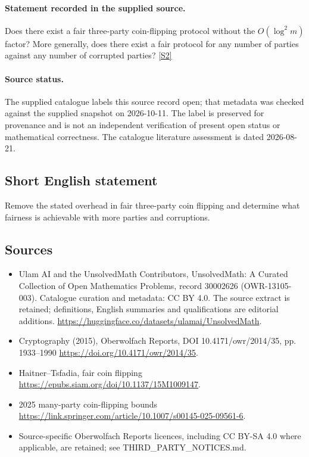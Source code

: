 \documentclass[11pt]{article}
\begin{document}
\paragraph{Statement recorded in the supplied source.}
Does there exist a fair three-party coin-flipping protocol without the $O(\log^2 m)$ factor? More generally, does there exist a fair protocol for any number of parties against any number of corrupted parties? \href{https://doi.org/10.4171/owr/2014/35}{[S2]}
\paragraph{Source status.}
The supplied catalogue labels this source record open; that metadata was checked against the supplied snapshot on 2026-10-11. The label is preserved for provenance and is not an independent verification of present open status or mathematical correctness. The catalogue literature assessment is dated 2026-08-21.
\subsection{Short English statement}
Remove the stated overhead in fair three-party coin flipping and determine what fairness is achievable with more parties and corruptions.
\subsection{Sources}
\begin{itemize}
\item[S1] Ulam AI and the UnsolvedMath Contributors, UnsolvedMath: A Curated Collection of Open Mathematics Problems, record 30002626 (OWR-13105-003). Catalogue curation and metadata: CC BY 4.0. The source extract is retained; definitions, English summaries and qualifications are editorial additions.
\url{https://huggingface.co/datasets/ulamai/UnsolvedMath}.
\item[S2] Cryptography (2015), Oberwolfach Reports, DOI 10.4171/owr/2014/35, pp. 1933--1990
\url{https://doi.org/10.4171/owr/2014/35}.
\item[S3] Haitner--Tsfadia, fair coin flipping
\url{https://epubs.siam.org/doi/10.1137/15M1009147}.
\item[S4] 2025 many-party coin-flipping bounds
\url{https://link.springer.com/article/10.1007/s00145-025-09561-6}.
\item Source-specific Oberwolfach Reports licences, including CC BY-SA 4.0 where applicable, are retained; see THIRD\_PARTY\_NOTICES.md.
\end{itemize}
\end{document}
